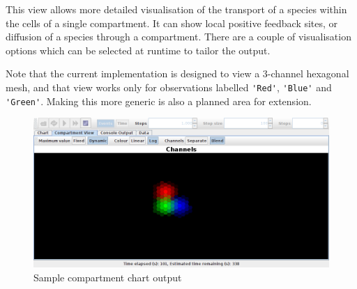 This view allows more detailed visualisation of the transport of a species within the cells of a single compartment. It can show local positive feedback sites, or diffusion of a species through a compartment. There are a couple of visualisation options which can be selected at runtime to tailor the output.

Note that the current implementation is designed to view a 3-channel hexagonal mesh, and that view works only for observations labelled \verb|'Red'|, \verb|'Blue'| and \verb|'Green'|. Making this more generic is also a planned area for extension.

\begin{figure}[h!]
 \centering
 \includegraphics[scale=0.3]{./images/CompartmentView.png}
 \caption{Sample compartment chart output}
 \label{fig:compartmentPane}
\end{figure}
